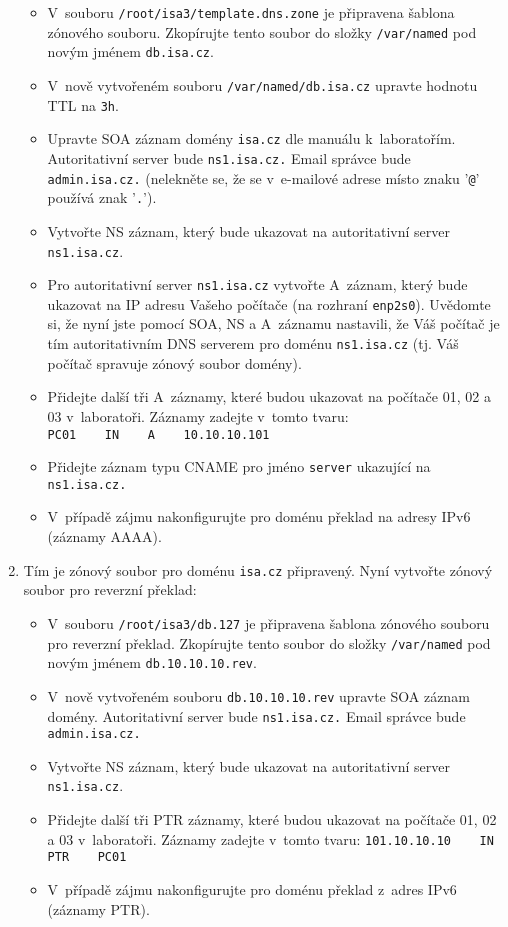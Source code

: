 \begin{enumerate}
    \begin{itemize}
      \item V~souboru {\tt /root/isa3/template.dns.zone} je připravena šablona zónového souboru.
            Zkopírujte tento soubor do složky {\tt /var/named} pod novým jménem {\tt db.isa.cz}.
      \item V~nově vytvořeném souboru {\tt /var/named/db.isa.cz} upravte hodnotu TTL na {\tt 3h}.
      \item Upravte SOA záznam domény {\tt isa.cz} dle manuálu k~laboratořím. Autoritativní server bude {\tt ns1.isa.cz.}
            Email správce bude {\tt admin.isa.cz.} (nelekněte se, že se v~e-mailové adrese místo znaku '{\tt @}' používá znak '{\tt .}').
      \item Vytvořte NS záznam, který bude ukazovat na autoritativní server {\tt ns1.isa.cz}.
      \item Pro autoritativní server {\tt ns1.isa.cz} vytvořte A~záznam, který bude ukazovat na IP adresu Vašeho počítače (na rozhraní {\tt enp2s0}).
            Uvědomte si, že nyní jste pomocí SOA, NS a A~záznamu nastavili, že Váš počítač je tím autoritativním DNS serverem pro doménu {\tt ns1.isa.cz} (tj. Váš počítač spravuje zónový soubor domény).
      \item Přidejte další tři A~záznamy, které budou ukazovat na počítače 01, 02 a 03 v~laboratoři. Záznamy zadejte v~tomto tvaru:\\
            \verb|PC01    IN    A    10.10.10.101|
      \item Přidejte záznam typu CNAME pro jméno {\tt server} ukazující na {\tt ns1.isa.cz.}
      \item V~případě zájmu nakonfigurujte pro doménu překlad na adresy IPv6 (záznamy AAAA).
    \end{itemize}
    
  \item Tím je zónový soubor pro doménu {\tt isa.cz} připravený. Nyní vytvořte zónový soubor pro reverzní překlad:
  
    \begin{itemize}
      \item V~souboru {\tt /root/isa3/db.127} je připravena šablona zónového souboru pro reverzní překlad.
            Zkopírujte tento soubor do složky {\tt /var/named} pod novým jménem {\tt db.10.10.10.rev}.
      \item V~nově vytvořeném souboru {\tt db.10.10.10.rev} upravte SOA záznam domény. Autoritativní server bude {\tt ns1.isa.cz.}
            Email správce bude {\tt admin.isa.cz.}
      \item Vytvořte NS záznam, který bude ukazovat na autoritativní server {\tt ns1.isa.cz}.
      \item Přidejte další tři PTR záznamy, které budou ukazovat na počítače 01, 02 a 03 v~laboratoři. Záznamy zadejte v~tomto tvaru:
            \verb|101.10.10.10    IN    PTR    PC01|
      \item V~případě zájmu nakonfigurujte pro doménu překlad z~adres IPv6 (záznamy PTR).
    \end{itemize} 
    

\end{enumerate}
